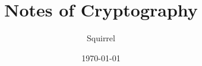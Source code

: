 \documentclass[12pt, a4paper, utf8]{article}
\title{\textbf{Notes of Cryptography}}
\author{Squirrel}
\date{\today}
\begin{document}
	\iffalse
		\maketitle
		\clearpage
		
		\section*{Preface}
		
		\subsection*{Course}
		密碼學設計與分析Cryptography Design and Analysis (11320IIS500900) in NTHU
	
		\clearpage
	\fi

	
	
	
	
	
	
	
	
	
	
	
\end{document}

